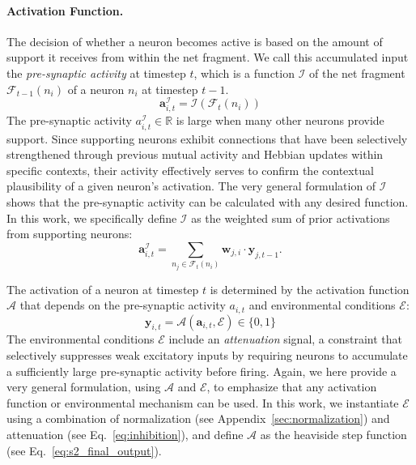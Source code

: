 \documentclass[12pt]{article}
\begin{document}
\paragraph{Activation Function.}
The decision of whether a neuron becomes active is based on the amount of support it receives from within the net fragment. We call this accumulated input the \emph{pre-synaptic activity} at timestep $t$, which is a function $\mathcal{I}$ of the net fragment $\mathcal{F}_{t-1}(n_i)$ of a neuron $n_i$ at timestep $t-1$. %
%
\begin{equation}
  \boldsymbol{a}^\mathcal{I}_{i, t} = \mathcal{I}\left(\mathcal{F}_{t}(n_i) \right)  
  \label{eq:pre_synaptic_activity}
\end{equation}
%
The pre-synaptic activity $a^\mathcal{I}_{i, t} \in \mathbb{R}$ is large when many other neurons provide support.
Since supporting neurons exhibit connections that have been selectively strengthened through previous mutual activity and Hebbian updates within specific contexts, their activity effectively serves to confirm the contextual plausibility of a given neuron's activation.
The very general formulation of $\mathcal{I}$ shows that the pre-synaptic activity can be calculated with any desired function.
In this work, we specifically define $\mathcal{I}$ as the weighted sum of prior activations from supporting neurons:
%
\begin{equation}
\boldsymbol{a}^\mathcal{I}_{i, t} = \sum_{n_j \in \mathcal{F}_{t}(n_i)} \boldsymbol{w}_{j,i} \cdot \boldsymbol{y}_{j,t-1}.
\label{eq:specific_pre_synaptic_activity}
\end{equation}


The activation of a neuron at timestep $t$ is determined by the activation function $\mathcal{A}$ that depends on the pre-synaptic activity $a_{i, t}$ and environmental conditions $\mathcal{E}$: 
%
\begin{equation}
  \boldsymbol{y}_{i, t} = \mathcal{A} \left(\boldsymbol{a}_{i, t}, \mathcal{E} \right) \in \{0,1\}
  \label{eq:activation_framework}
\end{equation}
%
The environmental conditions $\mathcal{E}$ include an \emph{attenuation} signal, a constraint that selectively suppresses weak excitatory inputs by requiring neurons to accumulate a sufficiently large pre-synaptic activity before firing.
Again, we here provide a very general formulation, using $\mathcal{A}$ and $\mathcal{E}$, to emphasize that any activation function or environmental mechanism can be used.
In this work, we instantiate $\mathcal{E}$ using a combination of normalization (see Appendix~\ref{sec:normalization}) and attenuation (see Eq.~\ref{eq:inhibition}), and define $\mathcal{A}$ as the heaviside step function (see Eq.~\ref{eq:s2_final_output}). 
\end{document}
